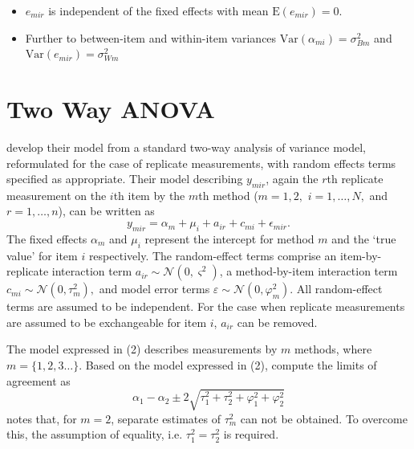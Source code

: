 \documentclass[12pt, a4paper]{report}
\theoremstyle{plain}
\theoremstyle{definition}
\theoremstyle{remark}
\begin{document}
	\begin{itemize}
		\item $e_{mir}$ is independent of the fixed effects with mean $\mbox{E}(e_{mir}) = 0$.
		\item Further to \citet{barnhart} between-item and within-item variances $\mbox{Var}(\alpha_{mi}) = \sigma^2_{Bm}$ and $\mbox{Var}(e_{mir}) = \sigma^2_{Wm}$
		
	\end{itemize}


	
	\section{Two Way ANOVA}
	
	\citet{BXC2008} develop their model from a standard two-way analysis of variance model, reformulated for the case of replicate measurements, with random effects terms specified as appropriate. 
	Their model describing $y_{mir} $, again the $r$th replicate measurement on the $i$th item by the $m$th method ($m=1,2,$ $i=1,\ldots,N,$ and $r = 1,\ldots,n$), can be written as
	\begin{equation}\label{BXC-model}
		y_{mir}  = \alpha_{m} + \mu_{i} + a_{ir} + c_{mi} + \epsilon_{mir}.
	\end{equation}
	The fixed effects $\alpha_{m}$ and $\mu_{i}$  represent the intercept for method $m$ and the `true value' for item $i$ respectively. The random-effect terms comprise an item-by-replicate interaction term $a_{ir} \sim \mathcal{N}(0,\varsigma^{2})$, a method-by-item interaction term $c_{mi} \sim \mathcal{N}(0,\tau^{2}_{m}),$ and model error terms $\varepsilon \sim \mathcal{N}(0,\varphi^{2}_{m}).$ All random-effect terms are assumed to be independent.
	For the case when replicate measurements are assumed to be exchangeable for item $i$, $a_{ir}$ can be removed.
	
	The model expressed in (2) describes measurements by $m$ methods, where $m = \{1,2,3\ldots\}$. Based on the model expressed in (2), \citet{BXC2008} compute the limits of agreement as
	\[
	\alpha_1 - \alpha_2 \pm 2 \sqrt{ \tau^2_1 +  \tau^2_2 +  \varphi^2_1 +  \varphi^2_2 }
	\]
	\citet{BXC2008} notes that, for $m=2$,  separate estimates of $\tau^2_m$ can not be obtained. To overcome this, the assumption of equality, i.e. $\tau^2_1 = \tau^2_2$ is required.
	
\end{document}

